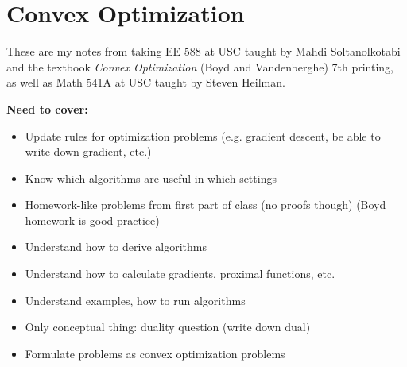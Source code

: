 %
%
%
%
%
%
%
%
%

\section{Convex Optimization}

These are my notes from taking EE 588 at USC taught by Mahdi Soltanolkotabi and the textbook \textit{Convex Optimization} (Boyd and Vandenberghe) 7th printing, as well as Math 541A at USC taught by Steven Heilman.

\textbf{Need to cover:}

\begin{itemize}

\item Update rules for optimization problems (e.g. gradient descent, be able to write down gradient, etc.)

\item Know which algorithms are useful in which settings

\item Homework-like problems from first part of class (no proofs though) (Boyd homework is good practice)

\item Understand how to derive algorithms

\item Understand how to calculate gradients, proximal functions, etc.

\item Understand examples, how to run algorithms

\item Only conceptual thing: duality question (write down dual)

\item Formulate problems as convex optimization problems

\end{itemize}

